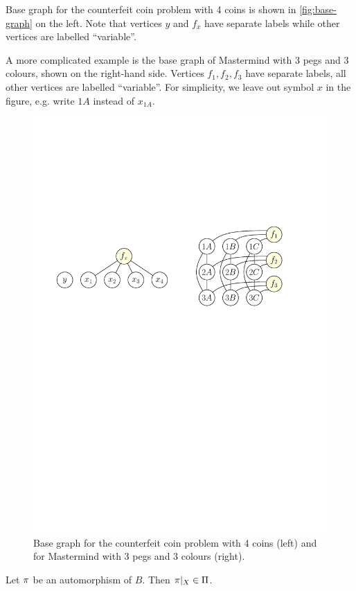 \begin{example} \label{ex:cc-runbase}
Base graph for the counterfeit coin problem with 4 coins is shown in
\autoref{fig:base-graph} on the left.
Note that vertices $y$ and $f_x$ have separate labels while
  other vertices are labelled ``variable''.

A more complicated example is the base graph of Mastermind with 3 pegs and 3 colours,
  shown on the right-hand side.
Vertices $f_1, f_2, f_3$ have separate labels, all other vertices are labelled ``variable''.
For simplicity, we leave out symbol $x$ in the figure, e.g.
  write $1A$ instead of $x_{1A}$.\eqed
\begin{figure}[h]
\begin{center}
\includegraphics[width=.7\textwidth]{pictures/base-graph.pdf}
\caption{Base graph for the counterfeit coin problem with 4 coins (left) and\\
  for Mastermind with 3 pegs and 3 colours (right).}
\label{fig:base-graph}
\end{center}
\end{figure}
\end{example}

\begin{lemma}
Let  $\pi$ be an automorphism of $B$. Then $\pi|_X \in\Pi$.
\end{lemma}

